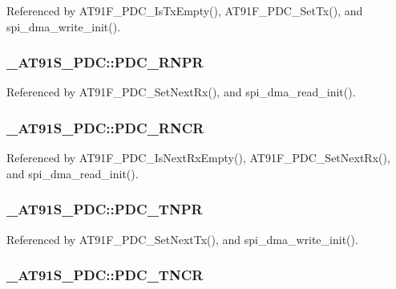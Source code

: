 Referenced by AT91F\_\-PDC\_\-IsTxEmpty(), AT91F\_\-PDC\_\-SetTx(), and spi\_\-dma\_\-write\_\-init().\hypertarget{struct__AT91S__PDC_6454ec358a78c11a66179bb97832f2d3}{
\subsubsection{ {\bf \_\-AT91S\_\-PDC::PDC\_\-RNPR}}}
\label{struct__AT91S__PDC_6454ec358a78c11a66179bb97832f2d3}




Referenced by AT91F\_\-PDC\_\-SetNextRx(), and spi\_\-dma\_\-read\_\-init().\hypertarget{struct__AT91S__PDC_d63bbe1f7711aa4b34853bbbe75d6104}{
\subsubsection{ {\bf \_\-AT91S\_\-PDC::PDC\_\-RNCR}}}
\label{struct__AT91S__PDC_d63bbe1f7711aa4b34853bbbe75d6104}




Referenced by AT91F\_\-PDC\_\-IsNextRxEmpty(), AT91F\_\-PDC\_\-SetNextRx(), and spi\_\-dma\_\-read\_\-init().\hypertarget{struct__AT91S__PDC_21220f0508a5ec5c7737a82afa89dc35}{
\subsubsection{ {\bf \_\-AT91S\_\-PDC::PDC\_\-TNPR}}}
\label{struct__AT91S__PDC_21220f0508a5ec5c7737a82afa89dc35}




Referenced by AT91F\_\-PDC\_\-SetNextTx(), and spi\_\-dma\_\-write\_\-init().\hypertarget{struct__AT91S__PDC_4b2288712d4b7e04c414ad20d302915d}{
\subsubsection{ {\bf \_\-AT91S\_\-PDC::PDC\_\-TNCR}}}
\label{struct__AT91S__PDC_4b2288712d4b7e04c414ad20d302915d}




